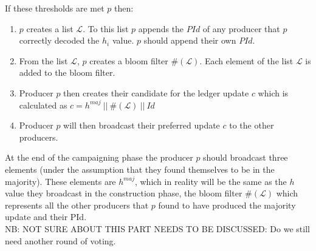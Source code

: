 If these thresholds are met $p$ then:
\begin{enumerate}
\item $p$ creates a list $\mathcal{L}$. To this list $p$ appends the $PId$ of any producer that $p$ correctly decoded the $h_i$ value. $p$ should append their own $PId$.
\item From the list $\mathcal{L}$, $p$ creates a bloom filter $\#(\mathcal{L})$. Each element of the list  $\mathcal{L}$ is added to the bloom filter. 
\item Producer $p$ then creates their candidate for the ledger update $c$ which is calculated as $c = h^{maj}~||~\#(\mathcal{L})~||~Id$
\item Producer $p$ will then broadcast their preferred update $c$ to the other producers.
\end{enumerate}

At the end of the campaigning phase the producer $p$ should broadcast three elements (under the assumption that they found themselves to be in the majority). These elements are $h^{maj}$, which in reality will be the same as the $h$ value they broadcast in the construction phase, the bloom filter $\#(\mathcal{L})$ which represents all the other producers that $p$ found to have produced the majority update and their PId. \\


NB: NOT SURE ABOUT THIS PART NEEDS TO BE DISCUSSED: Do we still need another round of voting. 



